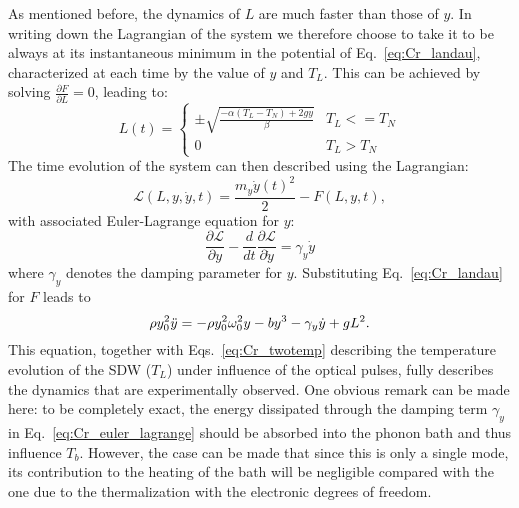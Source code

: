 As mentioned before, the dynamics of $L$ are much faster than those of $y$.
In writing down the Lagrangian of the system we therefore choose to take it to be always at its instantaneous minimum in the potential of Eq.~\eqref{eq:Cr_landau}, characterized at each time by the value of $y$ and $T_L$.
This can be achieved by solving $\frac{\partial F}{\partial L} = 0$, leading to:
\begin{equation}
	\label{eq:Cr_L0}
	L(t) =
	\begin{cases}
		\pm \sqrt{\frac{- \alpha (T_L - T_N) + 2 g y}{\beta}} & T_L <= T_N\\
		0 & T_L > T_N
	\end{cases}
\end{equation}
The time evolution of the system can then described using the Lagrangian:
\begin{equation}
    \mathcal{L}(L, y, \dot{y}, t) = \frac{m_y \dot{y}(t)^2}{2} - F(L, y, t),
\end{equation}
with associated Euler-Lagrange equation for $y$:
\begin{equation}
    \frac{\partial \mathcal{L}}{\partial y} - \frac{d}{dt}\frac{\partial \mathcal{L}}{\partial \dot{y}} = \gamma_y \dot{y}
\end{equation}
where $\gamma_y$ denotes the damping parameter for $y$.
Substituting Eq.~\eqref{eq:Cr_landau} for $F$ leads to 
\begin{equation}
	\label{eq:Cr_euler_lagrange}
	    \rho y_0^2 \Ddot{y} = -\rho y_0^2 \omega_0^2 y  - b y^3 - \gamma_y \dot{y} + gL^2.
\end{equation}
This equation, together with Eqs.~\ref{eq:Cr_twotemp} describing the temperature evolution of the SDW ($T_L$) under influence of the optical pulses, fully describes the dynamics that are experimentally observed.
One obvious remark can be made here: to be completely exact, the energy dissipated through the damping term $\gamma_y$ in Eq.~\eqref{eq:Cr_euler_lagrange} should be absorbed into the phonon bath and thus influence $T_b$.
However, the case can be made that since this is only a single mode, its contribution to the heating of the bath will be negligible compared with the one due to the thermalization with the electronic degrees of freedom.

